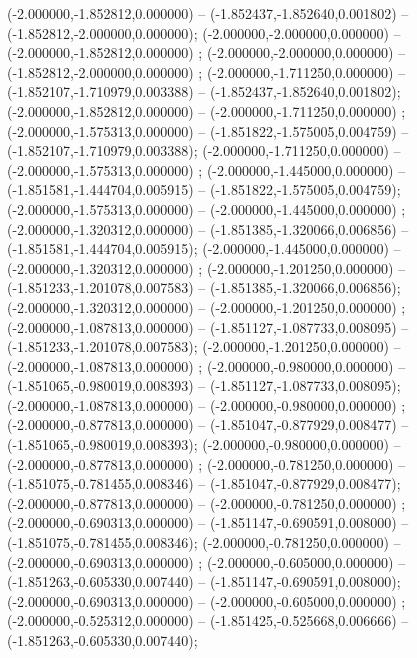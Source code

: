  (-2.000000,-1.852812,0.000000) -- (-1.852437,-1.852640,0.001802) -- (-1.852812,-2.000000,0.000000);
 (-2.000000,-2.000000,0.000000) -- (-2.000000,-1.852812,0.000000) ;
 (-2.000000,-2.000000,0.000000) -- (-1.852812,-2.000000,0.000000) ;
 (-2.000000,-1.711250,0.000000) -- (-1.852107,-1.710979,0.003388) -- (-1.852437,-1.852640,0.001802);
 (-2.000000,-1.852812,0.000000) -- (-2.000000,-1.711250,0.000000) ;
 (-2.000000,-1.575313,0.000000) -- (-1.851822,-1.575005,0.004759) -- (-1.852107,-1.710979,0.003388);
 (-2.000000,-1.711250,0.000000) -- (-2.000000,-1.575313,0.000000) ;
 (-2.000000,-1.445000,0.000000) -- (-1.851581,-1.444704,0.005915) -- (-1.851822,-1.575005,0.004759);
 (-2.000000,-1.575313,0.000000) -- (-2.000000,-1.445000,0.000000) ;
 (-2.000000,-1.320312,0.000000) -- (-1.851385,-1.320066,0.006856) -- (-1.851581,-1.444704,0.005915);
 (-2.000000,-1.445000,0.000000) -- (-2.000000,-1.320312,0.000000) ;
 (-2.000000,-1.201250,0.000000) -- (-1.851233,-1.201078,0.007583) -- (-1.851385,-1.320066,0.006856);
 (-2.000000,-1.320312,0.000000) -- (-2.000000,-1.201250,0.000000) ;
 (-2.000000,-1.087813,0.000000) -- (-1.851127,-1.087733,0.008095) -- (-1.851233,-1.201078,0.007583);
 (-2.000000,-1.201250,0.000000) -- (-2.000000,-1.087813,0.000000) ;
 (-2.000000,-0.980000,0.000000) -- (-1.851065,-0.980019,0.008393) -- (-1.851127,-1.087733,0.008095);
 (-2.000000,-1.087813,0.000000) -- (-2.000000,-0.980000,0.000000) ;
 (-2.000000,-0.877813,0.000000) -- (-1.851047,-0.877929,0.008477) -- (-1.851065,-0.980019,0.008393);
 (-2.000000,-0.980000,0.000000) -- (-2.000000,-0.877813,0.000000) ;
 (-2.000000,-0.781250,0.000000) -- (-1.851075,-0.781455,0.008346) -- (-1.851047,-0.877929,0.008477);
 (-2.000000,-0.877813,0.000000) -- (-2.000000,-0.781250,0.000000) ;
 (-2.000000,-0.690313,0.000000) -- (-1.851147,-0.690591,0.008000) -- (-1.851075,-0.781455,0.008346);
 (-2.000000,-0.781250,0.000000) -- (-2.000000,-0.690313,0.000000) ;
 (-2.000000,-0.605000,0.000000) -- (-1.851263,-0.605330,0.007440) -- (-1.851147,-0.690591,0.008000);
 (-2.000000,-0.690313,0.000000) -- (-2.000000,-0.605000,0.000000) ;
 (-2.000000,-0.525312,0.000000) -- (-1.851425,-0.525668,0.006666) -- (-1.851263,-0.605330,0.007440);
